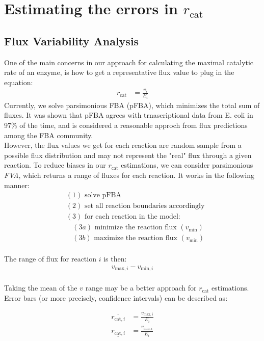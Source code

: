 \documentclass{article}
\newcommand{\rcat}{$r_\mathrm{cat}$ }
\begin{document}
\section*{Estimating the errors in \rcat}

\subsection*{Flux Variability Analysis}
One of the main concerns in our approach for calculating the maximal catalytic rate of an enzyme, is how to get a representative flux value to plug in the equation:
\begin{align}
r_\mathrm{cat} &= \frac{v_i}{E_i} 
\end{align}
Currently, we solve parsimonious FBA (pFBA), which minimizes the total sum of fluxes. It was shown that pFBA agrees with trnascriptional data from E. coli in 97\% of the time, and is considered a reasonable approch from flux predictions among the FBA community.\\
However, the flux values we get for each reaction are random sample from a possible flux distribution and may not represent the "real" flux through a given reaction. To reduce biases in our \rcat estimations, we can consider parsimonious \emph{FVA}, which returns a range of fluxes for each reaction. It works in the following manner:
\begin{align*}
&(1)\text{ solve pFBA} \\
&(2)\text{ set all reaction boundaries accordingly} \\
&(3)\text{ for each reaction in the model:} \\
&~~~~ (3a)\text{ minimize the reaction flux } (v_\mathrm{min}) \\
&~~~~ (3b)\text{ maximize the reaction flux } (v_\mathrm{min}) \\
\end{align*}

The range of flux for reaction $i$ is then:
\begin{align}
v_{\mathrm{max}, i} - v_{\mathrm{min}, i} \\
\end{align}

Taking the mean of the $v$ range may be a better approach for \rcat estimations. Error bars (or more precisely, confidence intervals) can be described as:

\begin{align}
\overline{r_{\mathrm{cat}, i}} &= \frac{v_{\mathrm{max}, i}}{E_i} \\
\underline{r_{\mathrm{cat}, i}} &= \frac{v_{\mathrm{min}, i}}{E_i} \\
\end{align}
\end{document}
